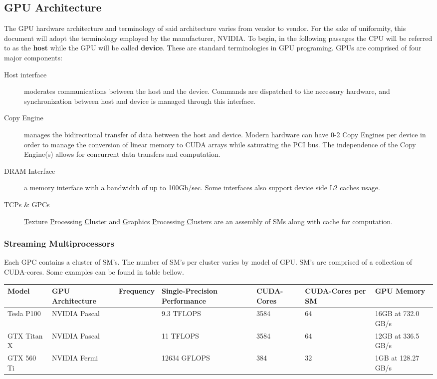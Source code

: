 \subsection{GPU Architecture}\label{ssec:gpu_architecture}
The GPU hardware architecture and terminology of said architecture varies from
vendor to vendor.  For the sake of uniformity, this document will adopt the
terminology employed by the manufacturer, NVIDIA.  To begin, in the following passages the CPU
will be referred to as the \textbf{host} while the GPU will be called \textbf{device}.
These are standard terminologies in GPU programing. GPUs are comprised of four major components:
\begin{description}
  \item[Host interface] moderates communications between the host and the device.
  Commands are dispatched to the necessary hardware, and synchronization between
  host and device is managed through this interface.
  \item[Copy Engine] manages the bidirectional transfer of data between the host
  and device.  Modern hardware can have 0-2 Copy Engines per device in order to
  manage the conversion of linear memory to CUDA arrays while saturating the PCI
  bus.  The independence of the Copy Engine(s) allows for concurrent data transfers
  and computation.
  \item[DRAM Interface] a memory interface with a bandwidth of up to 100Gb/sec\cite{Wilt}.
  Some interfaces also support device side L2 caches usage.
  \item[TCPs \& GPCs] \underline{T}exture \underline{P}rocessing \underline{C}luster
  and \underline{G}raphics \underline{P}rocessing \underline{C}lusters are an assembly
  of \Glspl{SM} along with cache for computation.
\end{description}\cite{Wilt}

\subsubsection{Streaming Multiprocessors}
Each GPC contains a cluster of SM's.  The number of SM's per cluster varies by
model of GPU. SM's are comprised of a collection of CUDA-cores.  Some examples
 can be found in table bellow.
\begin{center}\label{hardwareTable}
\begin{tabu} to 0.9\textwidth { | X[l] | X[c] | X[c] | X[c]| X[c]| X[c]| X[r] | }

 \hline
 Model & GPU Architecture & Frequency & Single-Precision Performance & CUDA-Cores & CUDA-Cores per SM & GPU Memory \\
 \hline
 Tesla P100 & NVIDIA Pascal & &9.3 TFLOPS & 3584 & 64 & 16GB at 732.0 GB/s\\
 \hline
 GTX Titan X & NVIDIA Pascal & & 11 TFLOPS & 3584 & 64 & 12GB at 336.5 GB/s\\
 \hline
 GTX 560 Ti & NVIDIA Fermi & &12634 GFLOPS & 384 & 32  & 1GB at 128.27 GB/s\\
\hline
\end{tabu}
\end{center}

